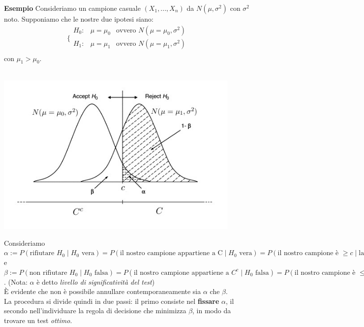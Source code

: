 \noindent \textbf{Esempio} Consideriamo un campione casuale $(X_1,...,X_n)$ da $N(\mu,\sigma^2)$ con $\sigma^2$ noto. Supponiamo che le nostre due ipotesi siano:
\\
$$\bigg \{
\begin{array}{lcr}
H_0: & \mu=\mu_0 & \text{ovvero } N(\mu=\mu_0,\sigma^2) \\
H_1: & \mu=\mu_1 & \text{ovvero } N(\mu=\mu_1,\sigma^2) \\
\end{array}
$$
con $\mu_1 > \mu_0$.\\
\\
\begin{center}
\includegraphics [width=12cm] {immagini/grafico_2.jpg}
\end{center}

Consideriamo $\alpha:= P(\text{rifiutare } H_0 \mid H_0 \text{ vera}) = P(\text{il nostro campione appartiene a C} \mid H_0 \text{ vera}) = P(\text{il nostro campione è } \geq c \mid \text{la distribuzione corretta è quella di sinistra}) = P(\text{commettere un errore di I tipo})$ e $\beta:= P(\text{non rifiutare } H_0 \mid H_0 \text{ falsa}) = P(\text{il nostro campione appartiene a } C^c \mid H_0 \text{ falsa}) = P(\text{il nostro campione è } \leq c \mid \text{la distribuzione corretta è quella di destra}) = P(\text{commettere un errore di II tipo})$. 
(Nota: $\alpha$ è detto \emph{livello di significatività del test})\\
È evidente che non è possibile annullare contemporaneamente sia $\alpha$ che $\beta$.\\
La procedura si divide quindi in due passi: il primo consiste nel \textbf{fissare} $\alpha$, il secondo nell'individuare la regola di decisione che minimizza $\beta$, in modo da trovare un test \textit{ottimo}.\\
\\
\\